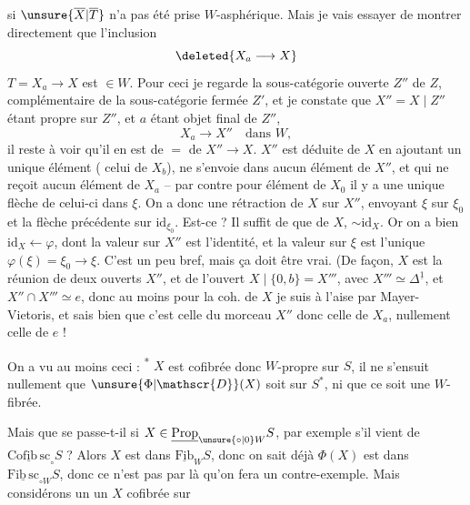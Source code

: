 si $\unsure{\overline{X}|\overline{T}}$ n'a pas été prise $W$-asphérique. Mais  je vais essayer de montrer directement que l'inclusion
\[
\deleted{X_a\longrightarrow X}
\]
 $T=X_a\longrightarrow X$ est $\in W$. Pour ceci je regarde la sous-catégorie ouverte $Z''$ de $Z$, complémentaire de la sous-catégorie  fermée $Z'$, et je constate que $X''=X\mid Z''$ étant propre sur $Z''$, et $a$ étant objet final de $Z''$, 
\[
X_a\longrightarrow X''\quad\text{dans }W,
\]
il reste à voir qu'il en est de $=$ de $X''\to X$.  $X''$ est déduite de $X$ en ajoutant un unique élément \inserted{$\unsure{\xi|\zeta}$} ( celui de $X_b$),  ne s'envoie dans aucun élément de $X''$, et qui ne reçoit aucun élément de $X_a$ -- par contre pour   élément  de $X_0$ il y a une unique flèche de celui-ci dans $\xi$. On a donc une rétraction de $X$ sur $X''$, envoyant $\xi$ sur $\xi_0$ et la flèche précédente sur $\mathrm{id}_{\xi_0}$. Est-ce   ? Il suffit de   que  \inserted{$\varphi$} de $X$,  $\sim\mathrm{id}_X$. Or on a bien $\mathrm{id}_X\leftarrow\varphi$, dont la valeur sur $X''$ est l'identité, et la valeur sur $\xi$ est l'unique $\varphi(\xi)=\xi_0\longrightarrow\xi$. C'est un peu bref, mais ça doit être vrai. (De  façon, $X$ est la réunion de deux ouverts $X''$, et de l'ouvert $X\mid\{0,b\}=X'''$, avec $X'''\simeq\Delta^{\underline{1}}$, et $X''\cap X'''\simeq e$, donc au moins pour la coh.  de $X$ je suis à l'aise par Mayer-Vietoris, et sais bien que c'est celle du morceau $X''$ donc celle de $X_a$, nullement celle de $e$ !

\margin{$\Vert$}
On a  vu au moins ceci : \textsuperscript{*} $X$ est cofibrée donc $W$-propre sur $S$, il ne s'ensuit nullement que $\unsure{\Phi|\mathscr{D}}(X)$ soit   sur $S^{*}$, ni que ce soit une $W$-fibrée.

Mais que se passe-t-il si $X\in\underline{\mathrm{Prop}}_{\unsure{\circ|0}W}S$, par exemple s'il  vient de $\underline{\mathrm{Cofib\,sc}}_{\circ}S$ ? Alors
  $X$ est dans $\underline{\mathrm{Fib}}_W S$, donc
on sait déjà  $\Phi(X)$ est dans $\underline{\mathrm{Fib\,sc}}_{\circ W}S$, donc ce n'est pas par là qu'on fera un contre-exemple. Mais considérons un un $X$ cofibrée sur

